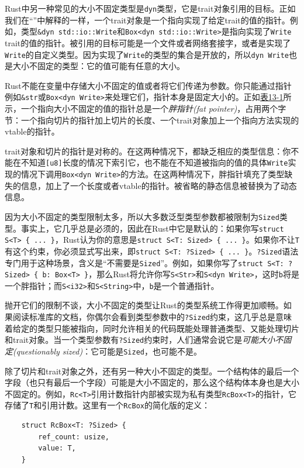 Rust中另一种常见的大小不固定类型是\texttt{dyn}类型，它是trait对象引用的目标。正如我们在“”中解释的一样，一个trait对象是一个指向实现了给定trait的值的指针。例如，类型\texttt{\&dyn std::io::Write}和\texttt{Box<dyn std::io::Write>}是指向实现了\texttt{Write} trait的值的指针。被引用的目标可能是一个文件或者网络套接字，或者是实现了\texttt{Write}的自定义类型。因为实现了\texttt{Write}的类型的集合是开放的，所以\texttt{dyn Write}也是大小不固定的类型：它的值可能有任意的大小。

Rust不能在变量中存储大小不固定的值或者将它们传递为参数。你只能通过指针例如\texttt{\&str}或\texttt{Box<dyn Write>}来处理它们，指针本身是固定大小的。正如\hyperref[f13-1]{表13-1}所示，一个指向大小不固定的值的指针总是一个\emph{胖指针(fat pointer)}，占用两个字节：一个指向切片的指针加上切片的长度、一个trait对象加上一个指向方法实现的vtable的指针。

trait对象和切片的指针是对称的。在这两种情况下，都缺乏相应的类型信息：你不能在不知道\texttt{[u8]}长度的情况下索引它，也不能在不知道被指向的值的具体\texttt{Write}实现的情况下调用\texttt{Box<dyn Write>}的方法。在这两种情况下，胖指针填充了类型缺失的信息，加上了一个长度或者vtable的指针。被省略的静态信息被替换为了动态信息。

因为大小不固定的类型限制太多，所以大多数泛型类型参数都被限制为\texttt{Sized}类型。事实上，它几乎总是必须的，因此在Rust中它是默认的：如果你写\texttt{struct S<T> \{ ... \}}，Rust认为你的意思是\texttt{struct S<T: Sized> \{ ... \}}。如果你不让\texttt{T}有这个约束，你必须显式写出来，即\texttt{struct S<T: ?Sized> \{ ... \}}。\texttt{?Sized}语法专门用于这种场景，含义是“不需要是\texttt{Sized}”。例如，如果你写了\texttt{struct S<T: ?Sized> \{ b: Box<T> \}}，那么Rust将允许你写\texttt{S<Str>}和\texttt{S<dyn Write>}，这时\texttt{b}将是一个胖指针；而\texttt{S<i32>}和\texttt{S<String>}中，\texttt{b}是一个普通指针。

抛开它们的限制不谈，大小不固定的类型让Rust的类型系统工作得更加顺畅。如果阅读标准库的文档，你偶尔会看到类型参数中的\texttt{?Sized}约束，这几乎总是意味着给定的类型只能被指向，同时允许相关的代码既能处理普通类型、又能处理切片和trait对象。当一个类型参数有\texttt{?Sized}约束时，人们通常会说它是\emph{可能大小不固定(questionably sized)}：它可能是\texttt{Sized}，也可能不是。

除了切片和trait对象之外，还有另一种大小不固定的类型。一个结构体的最后一个字段（也只有最后一个字段）可能是大小不固定的，那么这个结构体本身也是大小不固定的。例如，\texttt{Rc<T>}引用计数指针内部被实现为私有类型\texttt{RcBox<T>}的指针，它存储了\texttt{T}和引用计数。这里有一个\texttt{RcBox}的简化版的定义：
\begin{verbatim}
    struct RcBox<T: ?Sized> {
        ref_count: usize,
        value: T,
    }
\end{verbatim}

